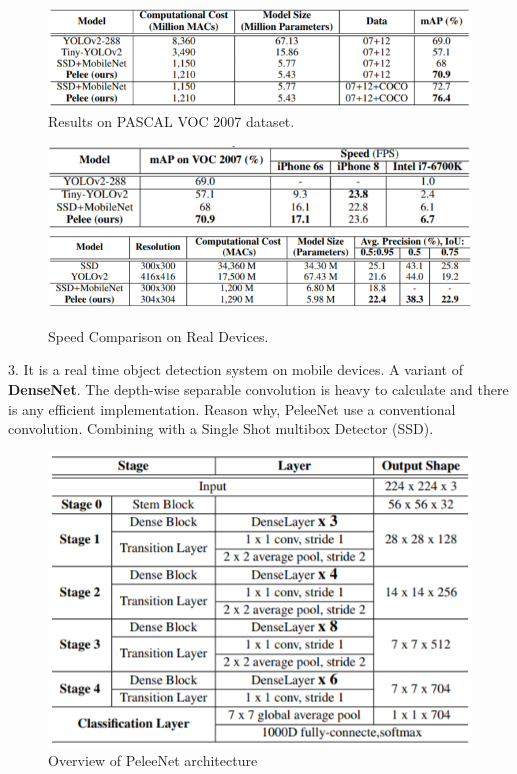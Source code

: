 \documentclass[10pt]{article}
\begin{document}
\begin{figure}[H]
  	\centering
    \includegraphics[scale=0.8]{Pelee4.PNG}
    \caption{Results on PASCAL VOC 2007 dataset.\cite{wang2018pelee}}
\end{figure}

\begin{figure}[H]
  	\centering
    \includegraphics[scale=0.9]{Pelee5.PNG}
    \includegraphics[scale=0.9]{Pelee6.PNG}
    \caption{Speed Comparison on Real Devices.\cite{wang2018pelee}}
\end{figure}

3. It is a real time object detection system on mobile devices. A variant of \textbf{DenseNet}.
The depth-wise separable convolution is heavy to calculate and there is any efficient implementation. Reason why, PeleeNet use a conventional convolution. Combining with a Single Shot multibox Detector (SSD).
\begin{figure}[H]
  	\centering
    \includegraphics[scale=0.7]{Pelee.PNG}
    \caption{Overview of PeleeNet architecture \cite{wang2018pelee}}
\end{figure}
\end{document}
